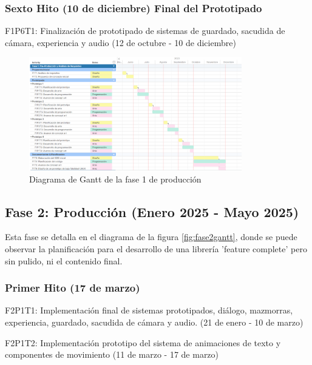 \subsubsection{Sexto Hito (10 de diciembre) Final del Prototipado}

\begin{compactitem}
\item F1P6T1: Finalización de prototipado de sistemas de guardado, sacudida de cámara, experiencia y audio (12 de octubre - 10 de diciembre)
\end{compactitem}

\begin{figure}[H]
  \centering
	\includegraphics[width=350px,clip=true]{gantt1.png}
  \caption{Diagrama de Gantt de la fase 1 de producción}
  \label{fig:fase1gantt}
\end{figure}

\subsection{Fase 2: Producción (Enero 2025 - Mayo 2025)}

Esta fase se detalla en el diagrama de la figura \ref{fig:fase2gantt}, donde se puede observar la planificación para el desarrollo de una librería 
'feature complete' pero sin pulido, ni el contenido final.

\subsubsection{Primer Hito (17 de marzo)}

\begin{compactitem}
\item F2P1T1: Implementación final de sistemas prototipados, diálogo, mazmorras, experiencia, guardado, sacudida de cámara y audio. (21 de enero - 10 de marzo)
\item F2P1T2: Implementación prototipo del sistema de animaciones de texto y componentes de movimiento (11 de marzo - 17 de marzo)
\end{compactitem}

